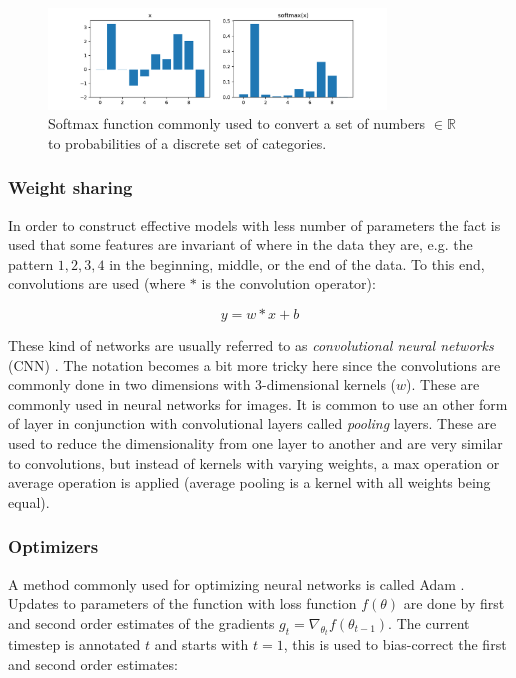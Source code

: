 \begin{figure}[h]
    \centering
    \includegraphics[width=0.8\textwidth]{res/softmax.pdf}

    \caption{Softmax function commonly used to convert a set of numbers $\in
    \mathbb{R}$ to probabilities of a discrete set of categories.}

    \label{fig:softmax}
\end{figure}

\subsubsection{Weight sharing}

In order to construct effective models with less number of parameters the fact
is used that some features are invariant of where in the data they are, e.g.
the pattern $1, 2, 3, 4$ in the beginning, middle, or the end of the data. To
this end, convolutions are used (where $*$ is the convolution operator):

\begin{equation}
    y = w * x + b
\end{equation}

These kind of networks are usually referred to as \textit{convolutional neural
networks} (CNN) \cite{lecun1989backpropagation}. The notation becomes a bit
more tricky here since the convolutions are commonly done in two dimensions
with 3-dimensional kernels ($w$). These are commonly used in neural networks
for images. It is common to use an other form of layer in conjunction with
convolutional layers called \textit{pooling} layers. These are used to reduce
the dimensionality from one layer to another and are very similar to
convolutions, but instead of kernels with varying weights, a max operation
\cite{huang2007unsupervised} or average operation \cite{lecun1998gradient} is
applied (average pooling is a kernel with all weights being equal).

\subsubsection{Optimizers}

A method commonly used for optimizing neural networks is called Adam
\cite{kingma2014adam}. Updates to parameters of the function with loss function
$f(\theta)$ are done by first and second order estimates of the gradients $g_t
= \nabla_{\theta_t} f(\theta_{t-1})$. The current timestep is annotated $t$ and
starts with $t = 1$, this is used to bias-correct the first and second order
estimates:

